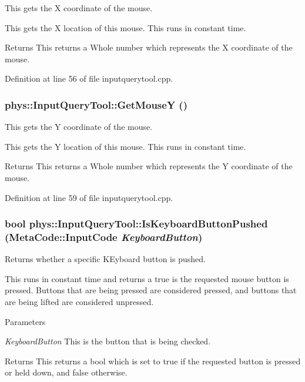 This gets the X coordinate of the mouse. 

This gets the X location of this mouse. This runs in constant time. \begin{DoxyReturn}{Returns}
This returns a Whole number which represents the X coordinate of the mouse. 
\end{DoxyReturn}


Definition at line 56 of file inputquerytool.cpp.

\hypertarget{classphys_1_1InputQueryTool_acbf87969054ab02e2a7bfc66d9cd4bdd}{
\subsubsection[{GetMouseY}]{ phys::InputQueryTool::GetMouseY ()}}
\label{da/d96/classphys_1_1InputQueryTool_acbf87969054ab02e2a7bfc66d9cd4bdd}


This gets the Y coordinate of the mouse. 

This gets the Y location of this mouse. This runs in constant time. \begin{DoxyReturn}{Returns}
This returns a Whole number which represents the Y coordinate of the mouse. 
\end{DoxyReturn}


Definition at line 59 of file inputquerytool.cpp.

\hypertarget{classphys_1_1InputQueryTool_a6f210acb5f4e2fe052b0c3c7c3ec9418}{
\subsubsection[{IsKeyboardButtonPushed}]{\setlength{\rightskip}{0pt plus 5cm}bool phys::InputQueryTool::IsKeyboardButtonPushed ({\bf MetaCode::InputCode} {\em KeyboardButton})}}
\label{da/d96/classphys_1_1InputQueryTool_a6f210acb5f4e2fe052b0c3c7c3ec9418}


Returns whether a specific KEyboard button is pushed. 

This runs in constant time and returns a true is the requested mouse button is pressed. Buttons that are being pressed are considered pressed, and buttons that are being lifted are considered unpressed. 
\begin{DoxyParams}{Parameters}
\item[{\em KeyboardButton}]This is the button that is being checked. \end{DoxyParams}
\begin{DoxyReturn}{Returns}
This returns a bool which is set to true if the requested button is pressed or held down, and false otherwise. 
\end{DoxyReturn}



